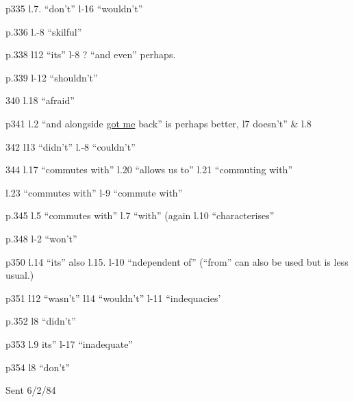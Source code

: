 
p335 l.7. ``don't'' l-16 ``wouldn't''

p.336 l.-8 ``skilful''

p.338 l12 ``its'' l-8 ? ``and even'' perhaps.

p.339 l-12 ``shouldn't'' 

340 l.18 ``afraid''

p341 l.2 ``and alongside \uline{got me} back'' is perhaps better, l7 doesn't'' \& l.8

342 l13 ``didn't'' l.-8 ``couldn't''

344 l.17 ``commutes with'' l.20 ``allows us to'' l.21 ``commuting with''

l.23 ``commutes with'' l-9 ``commute with''

p.345 l.5 ``commutes with'' l.7 ``with'' (again l.10 ``characterises''

p.348 l-2 ``won't''

p350 l.14 ``its'' also  l.15. l-10 ``ndependent of'' (``from'' can also be used but is less usual.)

p351 l12 ``wasn't'' l14 ``wouldn't'' l-11 ``indequacies'

p.352 l8 ``didn't''

p353 l.9 its'' l-17 ``inadequate''

p354 l8 ``don't''

Sent 6/2/84



